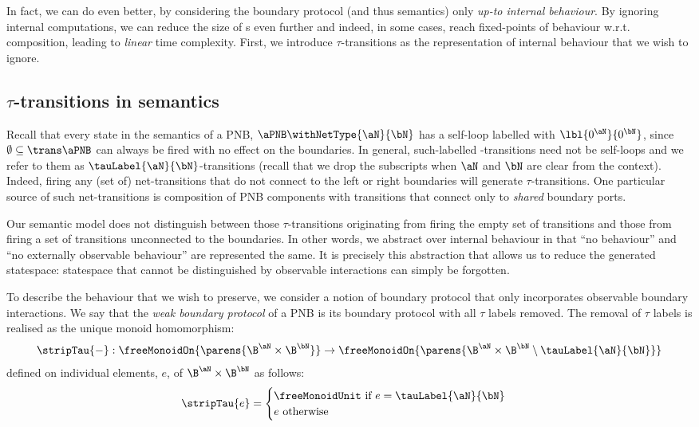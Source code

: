 In fact, we can do even better, by considering the boundary protocol (and thus
\TNFA{} semantics) only \emph{up-to internal behaviour}. By ignoring internal
computations, we can reduce the size of \TNFA{}s even further and indeed, in
some cases, reach fixed-points of behaviour w.r.t. composition, leading to
\emph{linear} time complexity.  First, we introduce $\tau$-transitions as the
representation of internal behaviour that we wish to ignore.

\subsection{$\tau$-transitions in \TNFA{} semantics}

Recall that every state in the \NFAB{\aN}{\bN} semantics of a PNB, $\aPNB
\withNetType{\aN}{\bN}$ has a self-loop labelled with $\lbl{0^\aN}{0^\bN}$,
since $\emptyset \subseteq \trans\aPNB$ can always be fired with no effect on
the boundaries. In general, such-labelled \TNFA-transitions need not be
self-loops and we refer to them as
$\tauLabel{\aN}{\bN}$-transitions (recall that we drop the subscripts when $\aN$
and $\bN$ are clear from the context). Indeed, firing any (set of) net-transitions
that do not connect to the left or right boundaries will generate
$\tau$-transitions. One particular source of such net-transitions is
composition of PNB components with transitions that connect only to
\emph{shared} boundary ports.

Our semantic model does not distinguish between those $\tau$-transitions
originating from firing the empty set of transitions and those from firing a
set of transitions unconnected to the boundaries. In other words, we abstract
over internal behaviour in that ``no behaviour'' and ``no externally observable
behaviour'' are represented the same. It is precisely this abstraction that
allows us to reduce the generated statespace: statespace that cannot be
distinguished by observable interactions can simply be forgotten.

To describe the behaviour that we wish to preserve, we consider a notion of
boundary protocol that only incorporates observable boundary interactions. We
say that the \emph{weak boundary protocol} of a PNB is its boundary protocol
with all $\tau$ labels removed. The removal of $\tau$ labels is realised as the
unique monoid homomorphism:
\[
    \stripTau{-} :
\freeMonoidOn{\parens{\B^\aN \times \B^\bN}} \to \freeMonoidOn{\parens{\B^\aN \times
\B^\bN \setminus \tauLabel{\aN}{\bN}}}
\]
defined on individual elements, $e$, of $\B^\aN \times \B^\bN$ as follows:
\[
    \stripTau{e} = \begin{cases} \freeMonoidUnit \text{\ if } e =
        \tauLabel{\aN}{\bN}\\
        e \text {\ otherwise}
    \end{cases}
\]

